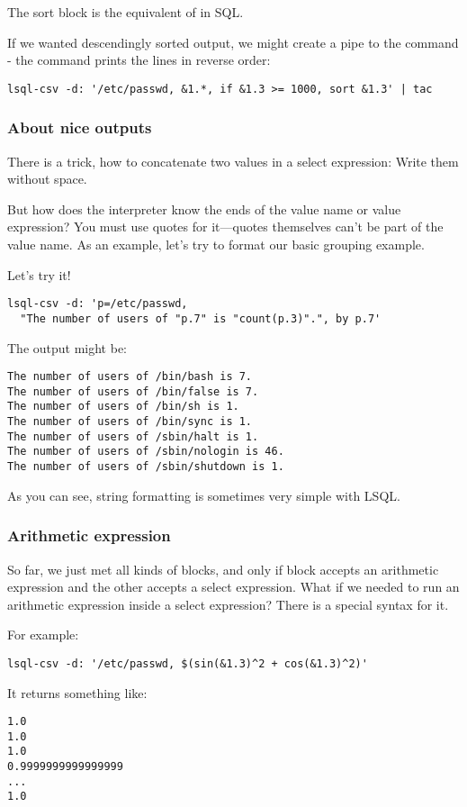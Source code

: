 The sort block is the equivalent of  in SQL.

If we wanted descendingly sorted output, we might create a pipe to the  command - the  command prints the lines in reverse order:
\begin{verbatim}
lsql-csv -d: '/etc/passwd, &1.*, if &1.3 >= 1000, sort &1.3' | tac
\end{verbatim}

\subsubsection{About nice outputs}
There is a trick, how to concatenate two values in a select expression: Write them without space.

But how does the interpreter know the ends of the value name or value expression? You must use quotes for it---quotes themselves can't be part of the value name.
As an example, let's try to format our basic grouping example.

Let's try it!
\begin{verbatim}
lsql-csv -d: 'p=/etc/passwd, 
  "The number of users of "p.7" is "count(p.3)".", by p.7'
\end{verbatim}
The output might be:
\begin{verbatim}
The number of users of /bin/bash is 7.
The number of users of /bin/false is 7.
The number of users of /bin/sh is 1.
The number of users of /bin/sync is 1.
The number of users of /sbin/halt is 1.
The number of users of /sbin/nologin is 46.
The number of users of /sbin/shutdown is 1.
\end{verbatim}

As you can see, string formatting is sometimes very simple with LSQL.

\subsubsection{Arithmetic expression}
So far, we just met all kinds of blocks, and only if block accepts an arithmetic expression and the other accepts a select expression.
What if we needed to run an arithmetic expression inside a select expression? There is a special syntax  for it.

For example:
\begin{verbatim}
lsql-csv -d: '/etc/passwd, $(sin(&1.3)^2 + cos(&1.3)^2)'
\end{verbatim}

It returns something like:
\begin{verbatim}
1.0
1.0
1.0
0.9999999999999999
...
1.0
\end{verbatim}

